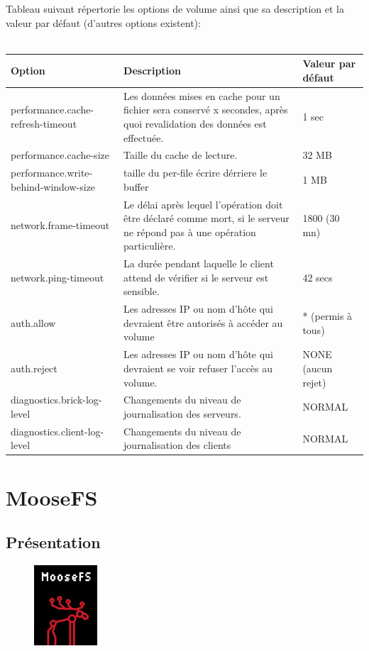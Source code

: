 \documentclass[12pt]{report}
\begin{document}
Tableau suivant répertorie les options de volume ainsi que sa description et la valeur par défaut (d'autres options existent):\\\\
\begin{tabular}{|p{5cm}|p{8cm}|m{4cm}|}
  \hline
  Option & Description & Valeur par défaut \\
  \hline
  performance.cache-refresh-timeout & Les données mises en cache pour un fichier sera conservé x secondes, après quoi revalidation des données est effectuée. & 1 sec \\
  \hline
  performance.cache-size & Taille du cache de lecture. & 32 MB \\
  \hline
  performance.write-behind-window-size & taille du per-file écrire dérriere le buffer & 1 MB \\
  \hline
  network.frame-timeout & Le délai après lequel l'opération doit être déclaré comme mort, si le serveur ne répond pas à une opération particulière. & 1800 (30 mn) \\
  \hline
  network.ping-timeout & La durée pendant laquelle le client attend de vérifier si le serveur est sensible. & 42 secs  \\
  \hline
  auth.allow & Les adresses IP ou nom d'hôte qui devraient être autorisés à accéder au volume & * (permis à tous) \\
  \hline
  auth.reject & Les adresses IP ou nom d'hôte qui devraient se voir refuser l'accès au volume. & NONE (aucun rejet) \\
  \hline
  diagnostics.brick-log-level & Changements du niveau de journalisation des serveurs. & NORMAL \\
  \hline
  diagnostics.client-log-level & Changements du niveau de journalisation des clients & NORMAL \\
  \hline
  
\end{tabular}
	\chapter{MooseFS}
		\section{Présentation}

			\begin{figure}[H]
				\begin{center}
					\includegraphics[width=0.15\linewidth]{images/moosefs.png}
				\end{center}
			\end{figure}
	
\end{document}
